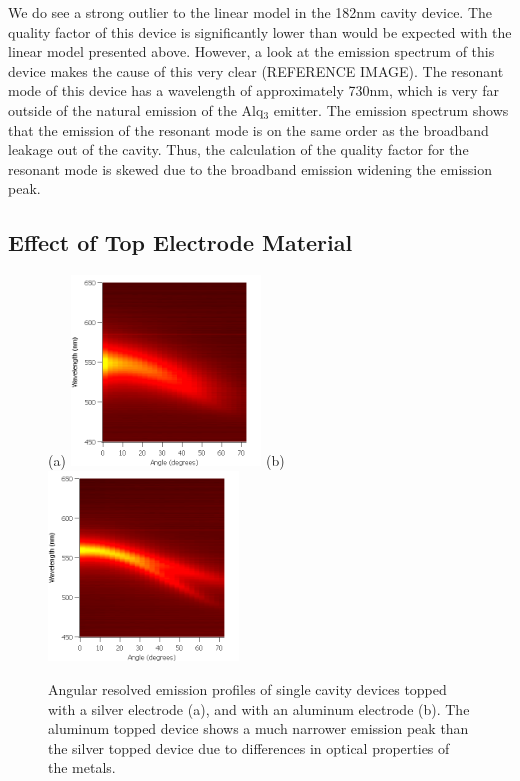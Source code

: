 \documentclass{report}
\begin{document}
            We do see a strong outlier to the linear model in the 182nm cavity device. The quality factor of this device is significantly lower than would be expected with the linear model presented above. However, a look at the emission spectrum of this device makes the cause of this very clear (REFERENCE IMAGE). The resonant mode of this device has a wavelength of approximately 730nm, which is very far outside of the natural emission of the Alq$_3$ emitter. The emission spectrum shows that the emission of the resonant mode is on the same order as the broadband leakage out of the cavity. Thus, the calculation of the quality factor for the resonant mode is skewed due to the broadband emission widening the emission peak.
        
        \subsection{Effect of Top Electrode Material} \label{topMaterial}
            \begin{figure}[h!]
                \centering
                (a)
                \includegraphics[width=0.45\textwidth]{images/n1_ag_top_heatmap.png}
                (b)
                \includegraphics[width=0.45\textwidth]{images/n1_al_top_heatmap.png}
                \caption{\small Angular resolved emission profiles of single cavity devices topped with a silver electrode (a), and with an aluminum electrode (b). The aluminum topped device shows a much narrower emission peak than the silver topped device due to differences in optical properties of the metals.}
                \label{fig:topMaterial}
            \end{figure}
\end{document}
